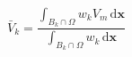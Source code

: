 $$
\bar V_k = \frac{\int_{B_k\cap\Omega} w_k V_m\,\mathrm d\mathbf x}{\int_{B_k\cap\Omega} w_k\,\mathrm d\mathbf x}
$$
